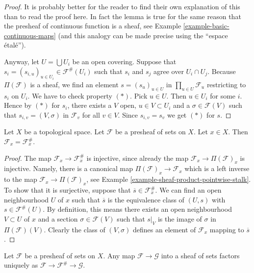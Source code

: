 \begin{proof}
It is probably better for the reader to find their own explanation
of this than to read the proof here. In fact the lemma is true
for the same reason that the presheaf of continuous
function is a sheaf, see Example \ref{example-basic-continuous-maps}
(and this analogy can be made precise using the ``espace \'etal\'e'').

\medskip\noindent
Anyway, let $U = \bigcup U_i$ be an open covering.
Suppose that $s_i = (s_{i, u})_{u \in U_i} \in \mathcal{F}^{\#}(U_i)$
such that $s_i$ and $s_j$ agree over $U_i \cap U_j$.
Because $\Pi(\mathcal{F})$ is a sheaf,
we find an element $s = (s_u)_{u\in U}$ in $\prod_{u\in U} \mathcal{F}_u$
restricting to $s_i$ on $U_i$. We have to check property $(*)$.
Pick $u \in U$. Then $u \in U_i$ for some $i$. Hence by $(*)$ for $s_i$,
there exists a $V$ open, $u \in V \subset U_i$
and a $\sigma \in \mathcal{F}(V)$
such that $s_{i, v} = (V, \sigma)$ in $\mathcal{F}_v$
for all $v \in V$. Since $s_{i, v} = s_v$ we get $(*)$ for $s$.
\end{proof}

\begin{lemma}
\label{lemma-stalk-sheafification}
Let $X$ be a topological space.
Let $\mathcal{F}$ be a presheaf of sets on $X$.
Let $x \in X$. Then $\mathcal{F}_x = \mathcal{F}^\#_x$.
\end{lemma}

\begin{proof}
The map $\mathcal{F}_x \to \mathcal{F}^\#_x$
is injective, since already the map
$\mathcal{F}_x \to \Pi(\mathcal{F})_x$ is injective.
Namely, there is a canonical map $\Pi(\mathcal{F})_x \to \mathcal{F}_x$
which is a left inverse to the map $\mathcal{F}_x \to \Pi(\mathcal{F})_x$,
see Example \ref{example-sheaf-product-pointwise-stalk}.
To show that it is surjective, suppose that
$\overline{s} \in \mathcal{F}^\#_x$.
We can find an open neighbourhood $U$ of $x$ such that
$\overline{s}$ is the equivalence class of $(U, s)$
with $s \in \mathcal{F}^\#(U)$.
By definition, this means there exists an open neighbourhood
$V \subset U$ of $x$ and a section $\sigma \in \mathcal{F}(V)$
such that $s|_V$ is the image of $\sigma$ in $\Pi(\mathcal{F})(V)$.
Clearly the class of $(V, \sigma)$ defines an element of
$\mathcal{F}_x$ mapping to $\overline{s}$.
\end{proof}

\begin{lemma}
\label{lemma-sheafify-universal}
Let $\mathcal{F}$ be a presheaf of sets on $X$.
Any map $\mathcal{F} \to \mathcal{G}$ into a sheaf of sets
factors uniquely as
$\mathcal{F} \to \mathcal{F}^\# \to \mathcal{G}$.
\end{lemma}

